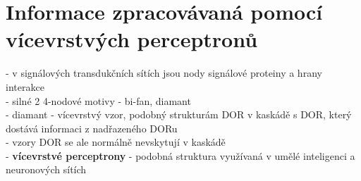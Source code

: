 \documentclass[11pt,a4paper]{report}
\begin{document}
\section{Informace zpracovávaná pomocí vícevrstvých perceptronů}
- v signálových transdukčních sítích jsou nody signálové proteiny a hrany interakce\\
- silné 2 4-nodové motivy - bi-fan, diamant\\
- diamant - vícevrstvý vzor, podobný strukturám DOR v kaskádě s DOR, který dostává informaci z nadřazeného DORu\\
\indent - vzory DOR se ale normálně nevskytují v kaskádě\\
- \textbf{vícevrstvé perceptrony} - podobná struktura využívaná v umělé inteligenci a neuronových sítích\\
\end{document}
